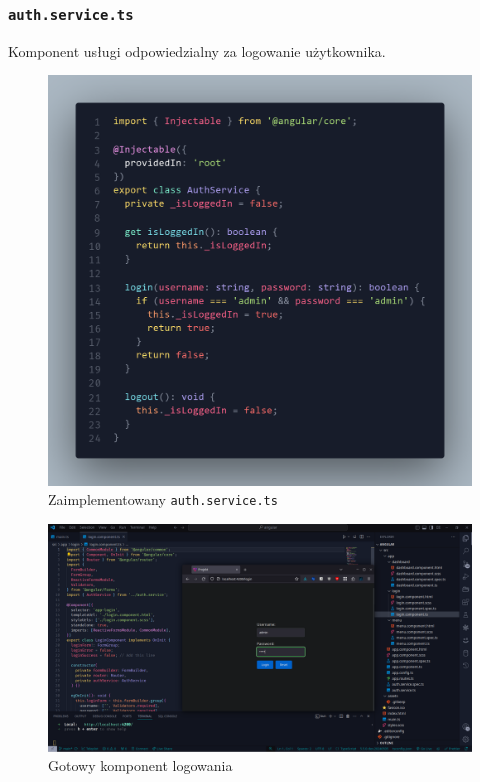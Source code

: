 \documentclass[12pt]{article}
\begin{document}
\subsubsection{\texttt{auth.service.ts}}
Komponent usługi odpowiedzialny za logowanie użytkownika.
\begin{figure}[H]
  \centering
  \includegraphics[width=\textwidth,height=\textheight,keepaspectratio]{image-8.png}
  \caption{Zaimplementowany \texttt{auth.service.ts}}
  \label{fig:image-8}
\end{figure}
\begin{figure}[H]
  \centering
  \includegraphics[width=1\textwidth]{image-3.png}
  \caption{Gotowy komponent logowania}
  \label{fig:image-3}
\end{figure}
\end{document}
